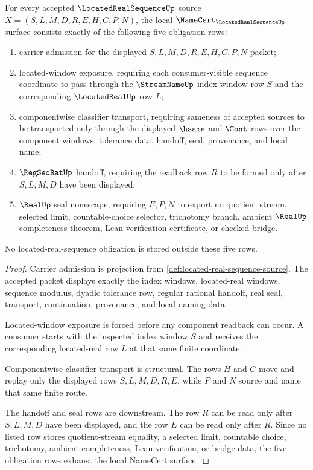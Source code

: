 \begin{theorem}
\label{thm:located-real-sequence-namecert-obligations}
For every accepted $\LocatedRealSequenceUp$ source $X=(S,L,M,D,R,E,H,C,P,N)$, the local $\NameCert_{\LocatedRealSequenceUp}$ surface consists exactly of the following five obligation rows:
\begin{enumerate}
\item carrier admission for the displayed $S,L,M,D,R,E,H,C,P,N$ packet;
\item located-window exposure, requiring each consumer-visible sequence coordinate to pass through the $\StreamNameUp$ index-window row $S$ and the corresponding $\LocatedRealUp$ row $L$;
\item componentwise classifier transport, requiring sameness of accepted sources to be transported only through the displayed $\hsame$ and $\Cont$ rows over the component windows, tolerance data, handoff, seal, provenance, and local name;
\item $\RegSeqRatUp$ handoff, requiring the readback row $R$ to be formed only after $S,L,M,D$ have been displayed;
\item $\RealUp$ seal nonescape, requiring $E,P,N$ to export no quotient stream, selected limit, countable-choice selector, trichotomy branch, ambient $\RealUp$ completeness theorem, Lean verification certificate, or checked bridge.
\end{enumerate}
No located-real-sequence obligation is stored outside these five rows.
\end{theorem}
\begin{proof}
Carrier admission is projection from \autoref{def:located-real-sequence-source}. The accepted packet displays exactly the index windows, located-real windows, sequence modulus, dyadic tolerance row, regular rational handoff, real seal, transport, continuation, provenance, and local naming data.

Located-window exposure is forced before any component readback can occur. A consumer starts with the inspected index window $S$ and receives the corresponding located-real row $L$ at that same finite coordinate.

Componentwise classifier transport is structural. The rows $H$ and $C$ move and replay only the displayed rows $S,L,M,D,R,E$, while $P$ and $N$ source and name that same finite route.

The handoff and seal rows are downstream. The row $R$ can be read only after $S,L,M,D$ have been displayed, and the row $E$ can be read only after $R$. Since no listed row stores quotient-stream equality, a selected limit, countable choice, trichotomy, ambient completeness, Lean verification, or bridge data, the five obligation rows exhaust the local NameCert surface.
\end{proof}

